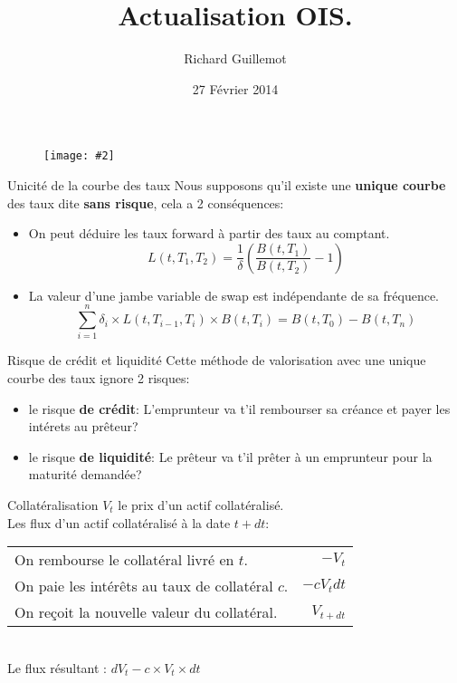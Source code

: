 \documentclass{beamer}
\title[Produits dérivés de taux]{Actualisation OIS. }
\author{Richard Guillemot}
\institute{Master IFMA}
\date{27 Février 2014}
\newcommand{\FIG}[2]{\texttt{[image: \#2]}}
\begin{document}
\begin{frame}
\titlepage
\begin{figure}[h]
\centering \FIG{5cm}{figures/UPMC_IFMA.jpg}
\end{figure}
\end{frame}

\begin{frame}{Unicité de la courbe des taux}
Nous supposons qu'il existe une \textbf{unique courbe} des taux dite \textbf{sans risque}, cela a 2 conséquences:
\begin{itemize}
\item On peut déduire les taux forward à partir des taux au comptant.
\[
L(t,T_1, T_2)=\frac{1}{\delta}\left(\frac{B(t,T_1)}{B(t,T_2)}-1\right)
\]
\item La valeur d'une jambe variable de swap est indépendante de sa fréquence.
\[
\sum_{i=1}^{n}\delta_i \times L(t,T_{i-1}, T_i) \times  B(t,T_i)=B(t,T_0)-B(t,T_n)
\]
\end{itemize}
\end{frame}

\begin{frame}{Risque de crédit et liquidité}
Cette méthode de valorisation avec une unique courbe des taux ignore 2 risques:
\begin{itemize}
\item le risque \textbf{de crédit}: L'emprunteur va t'il rembourser sa créance et payer les intérets au prêteur?
\item le risque \textbf{de liquidité}: Le prêteur va t'il prêter à un emprunteur pour la maturité demandée?
\end{itemize}
\end{frame}

\begin{frame}{Collatéralisation}
$V_t$ le prix d'un actif collatéralisé.\\
\vspace{0.5cm}
Les flux d'un actif collatéralisé à la date $t+dt$:\\
\vspace{0.5cm}
\begin{tabular}{l|r}
On rembourse le collatéral livré en $t$. & $-V_t$ \\
On paie les intérêts au taux de collatéral $c$.& $-c V_t dt$\\
On reçoit la nouvelle valeur du collatéral.& $V_{t+dt}$ \\
\end{tabular}
\vspace{0.5cm}\\
Le flux résultant : $dV_t - c \times V_t \times dt$
\end{frame}
\end{document}
